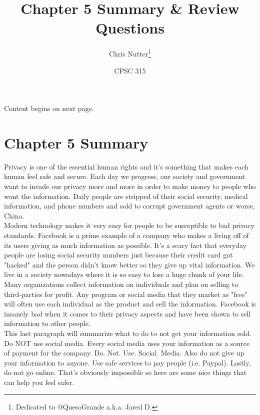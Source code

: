 \documentclass[12pt]{article}
\title{Chapter 5 Summary \& Review Questions}
\author{Chris Nutter\thanks{Dedicated to @QuesoGrande a.k.a. Jared D.}}
\date{CPSC 315}
\begin{document}
\maketitle

\normalsize

\tableofcontents    
\vspace{4ex}

\begin{center} Content begins on next page. \end{center}

\newpage

\section{Chapter 5 Summary}
    \indent Privacy is one of the essential human rights and it's something that makes each human feel safe and secure. Each day we progress, our society and government want to invade our privacy more and more in order to make money to people who want the information. Daily people are stripped of their social security, medical information, and phone numbers and sold to corrupt government agents or worse, China.\\
    \indent Modern technology makes it very easy for people to be susceptible to bad privacy standards. Facebook is a prime example of a company who makes a living off of its users giving as much information as possible. It's a scary fact that everyday people are losing social security numbers just because their credit card got "hacked" and the person didn't know better so they give up vital information. We live in a society nowadays where it is so easy to lose a huge chunk of your life.\\
    \indent Many organizations collect information on individuals and plan on selling to third-parties for profit. Any program or social media that they market as "free" will often use each individual as the product and sell the information. Facebook is insanely bad when it comes to their privacy aspects and have been shown to sell information to other people.\\
    \indent This last paragraph will summarize what to do to not get your information sold. Do NOT use social media. Every social media uses your information as a source of payment for the company. Do. Not. Use. Social. Media. Also do not give up your information to anyone. Use safe services to pay people (i.e. Paypal). Lastly, do not go online. That's obviously impossible so here are some nice things that can help you feel safer.
\end{document}

